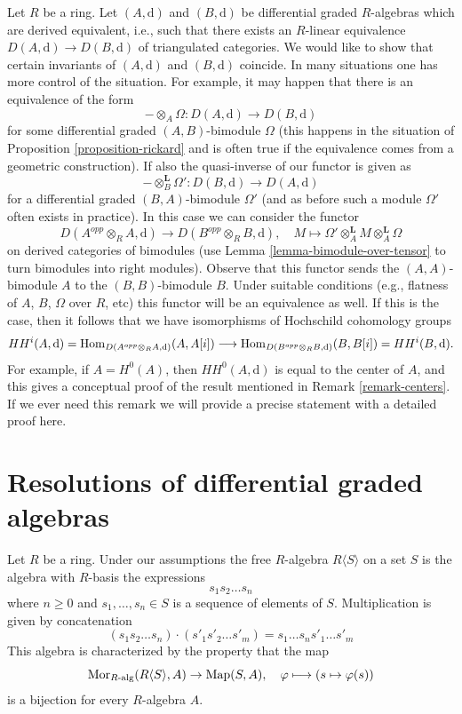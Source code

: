 \begin{remark}
\label{remark-hochschild-cohomology}
Let $R$ be a ring. Let $(A, \text{d})$ and $(B, \text{d})$ be differential
graded $R$-algebras which are derived equivalent, i.e., such that there
exists an $R$-linear equivalence $D(A, \text{d}) \to D(B, \text{d})$
of triangulated categories. We would like to show that certain invariants
of $(A, \text{d})$ and $(B, \text{d})$ coincide. In many situations
one has more control of the situation. For example, it may happen
that there is an equivalence of the form
$$
- \otimes_A \Omega : D(A, \text{d}) \longrightarrow D(B, \text{d})
$$
for some differential graded $(A, B)$-bimodule
$\Omega$ (this happens in the situation of
Proposition \ref{proposition-rickard} and is often true
if the equivalence comes from a geometric construction).
If also the quasi-inverse of our functor is given as
$$
- \otimes_B^\mathbf{L} \Omega' : D(B, \text{d}) \longrightarrow D(A, \text{d})
$$
for a differential graded $(B, A)$-bimodule $\Omega'$
(and as before such a module $\Omega'$ often exists in practice).
In this case we can consider the functor
$$
D(A^{opp} \otimes_R A, \text{d})
\longrightarrow
D(B^{opp} \otimes_R B, \text{d}),\quad
M \longmapsto \Omega' \otimes^\mathbf{L}_A M \otimes_A^\mathbf{L} \Omega
$$
on derived categories of bimodules (use
Lemma \ref{lemma-bimodule-over-tensor} to turn bimodules into
right modules).
Observe that this functor sends the $(A, A)$-bimodule $A$ to
the $(B, B)$-bimodule $B$. Under suitable conditions
(e.g., flatness of $A$, $B$, $\Omega$ over $R$, etc)
this functor will be an equivalence as well.
If this is the case, then it follows that we have isomorphisms
of Hochschild cohomology groups
$$
HH^i(A, \text{d}) =
\mathop{\mathrm{Hom}}\nolimits_{D(A^{opp} \otimes_R A, \text{d})}(A, A[i])
\longrightarrow
\mathop{\mathrm{Hom}}\nolimits_{D(B^{opp} \otimes_R B, \text{d})}(B, B[i]) =
HH^i(B, \text{d}).
$$
For example, if $A = H^0(A)$, then $HH^0(A, \text{d})$
is equal to the center of $A$, and this gives a conceptual proof
of the result mentioned in Remark \ref{remark-centers}.
If we ever need this remark we will provide a precise statement
with a detailed proof here.
\end{remark}



\section{Resolutions of differential graded algebras}
\label{section-resolution-dgas}

\noindent
Let $R$ be a ring. Under our assumptions the free $R$-algebra
$R\langle S \rangle$ on a set $S$ is the algebra with $R$-basis
the expressions
$$
s_1 s_2 \ldots s_n
$$
where $n \geq 0$ and $s_1, \ldots, s_n \in S$ is a sequence of
elements of $S$. Multiplication is given by concatenation
$$
(s_1 s_2 \ldots s_n) \cdot (s'_1 s'_2 \ldots s'_m) =
s_1 \ldots s_n s'_1 \ldots s'_m
$$
This algebra is characterized by the property that the map
$$
\mathop{\mathrm{Mor}}\nolimits_{R\text{-alg}}(R\langle S \rangle, A) \to
\text{Map}(S, A),\quad
\varphi \longmapsto (s \mapsto \varphi(s))
$$
is a bijection for every $R$-algebra $A$.

